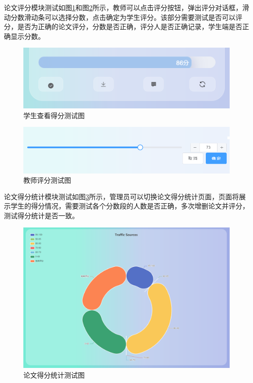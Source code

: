 论文评分模块测试如图\ref{score-student}和图\ref{score-teacher}所示，教师可以点击评分按钮，弹出评分对话框，滑动分数滑动条可以选择分数，点击确定为学生评分。该部分需要测试是否可以评分，是否为正确的论文评分，分数是否正确，评分人是否正确记录，学生端是否正确显示分数。

\begin{figure}[H]
  \centering
  \includegraphics[scale = 0.6]{out/figure/测试/score-student.png}
  \caption{\song\wuhao 学生查看得分测试图}
  \label{score-student}
\end{figure}

\begin{figure}[H]
  \centering
  \includegraphics[scale = 0.6]{out/figure/测试/score-teacher.png}
  \caption{\song\wuhao 教师评分测试图}
  \label{score-teacher}
\end{figure}

论文得分统计模块测试如图\ref{statistic-score-student-test}所示，管理员可以切换论文得分统计页面，页面将展示学生的得分情况，需要测试各个分数段的人数是否正确，多次增删论文并评分，测试得分统计是否一致。

\begin{figure}[H]
  \centering
  \includegraphics[scale = 0.48]{out/figure/测试/statistic-score-student-test.png}
  \caption{\song\wuhao 论文得分统计测试图}
  \label{statistic-score-student-test}
\end{figure}

